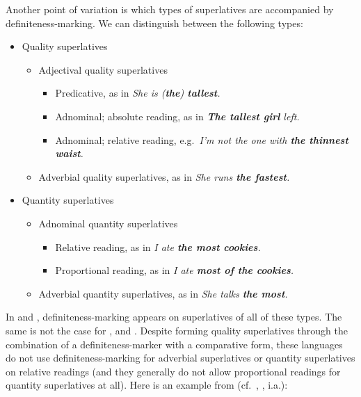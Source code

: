 \documentclass[output=paper
,modfonts
,nonflat]{langsci/langscibook}
\begin{document}
Another point of variation is which types of superlatives are accompanied by definiteness-marking. We can distinguish between the following types:
\begin{itemize}
\item {}Quality superlatives
\begin{itemize}
\item {}Adjectival quality superlatives
\begin{itemize}
\item Predicative, as in \textit{She is \textnormal{(}\textbf{the}\textnormal{)} \textbf{tallest}.}
\item {}Adnominal; absolute reading, as in \textit{\textbf{The tallest girl} left.}
\item {}Adnominal; relative reading, e.g.\ \textit{I'm not the one with \textbf{the thinnest waist}.}
\end{itemize}
\item Adverbial quality superlatives, as in \textit{She runs \textbf{the fastest}.}
\end{itemize}
\item Quantity superlatives
\begin{itemize}
\item {}Adnominal quantity superlatives
\begin{itemize}
\item Relative reading, as in \textit{I ate \textbf{the most cookies}.}
\item Proportional reading, as in \textit{I ate \textbf{most of the cookies}.}
\end{itemize}
\item {}Adverbial quantity superlatives, as in \textit{She talks \textbf{the most}.}
\end{itemize}
\end{itemize}

In  and , definiteness-marking appears on superlatives of all of these types. The same is not the case for ,  and . Despite forming quality superlatives through the combination of a definiteness-marker with a comparative form, these languages do not use definiteness-marking for adverbial superlatives or quantity superlatives on relative readings (and they generally do not allow proportional readings for quantity superlatives at all). Here is an example from  (cf.\ \citealt{deBoer1986}, \citealt{Dobrovie-SorinGiurgea2015}, i.a.):
\end{document}
